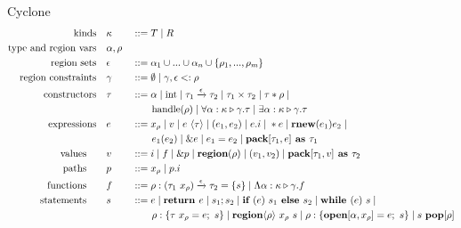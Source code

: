 \documentclass[aspectratio=169]{beamer}
\begin{document}
\begin{frame}{Cyclone}
\scriptsize{
\begin{alignat*}{2}
\text{kinds}\quad &\kappa &&::= T \altm R
\\
\text{type and region vars}\quad &\alpha,\rho &&
\\
\text{region sets}\quad &\epsilon &&::= \alpha_1 \cup ... \cup \alpha_n \cup \{\rho_1,...,\rho_m\}
\\
\text{region constraints} \quad &\gamma &&::= \emptyset \altm \gamma, \epsilon <: \rho
\\
\text{constructors} \quad &\tau &&::= \alpha \altm \text{int} \altm \tau_1 \xrightarrow[]{\epsilon} \tau_2 \altm \tau_1 \times \tau_2 \altm \tau \ast \rho \altm
\\
~ & ~ && \qquad \text{handle}(\rho) \altm \forall\alpha:\kappa \triangleright \gamma.\tau \altm \exists \alpha:\kappa \triangleright \gamma.\tau
\\
\text{expressions} \quad &e &&::= x_\rho \altm v \altm e\ \langle\tau\rangle \altm (e_1,e_2) \altm e.i \altm \ast e \altm \textbf{rnew}(e_1)e_2 \altm
\\
~ & ~ && \qquad e_1(e_2) \altm \&e \altm e_1 = e_2 \altm \textbf{pack} [\tau_1, e]\textbf{ as } \tau_1
\\
\text{values} \qquad &v &&::= i \altm f \altm \&p \altm \textbf{region}(\rho) \altm (v_1, v_2) \altm \textbf{pack}[\tau_1,v]\textbf{ as } \tau_2
\\
\text{paths} \qquad &p &&::= x_\rho \altm p.i
\\
\text{functions} \qquad &f &&::= \rho:(\tau_1\ x_{\rho}) \xrightarrow[]{\epsilon} \tau_2 = \{s\} \altm \Lambda\alpha:\kappa \triangleright \gamma.f
\\
\text{statements} \qquad &s &&::= e \altm \textbf{return } e \altm s_1;s_2 \altm \textbf{if } (e)\ s_1 \textbf{ else } s_2 \altm \textbf{while } (e)\ s \altm
\\
~ & ~ && \qquad \rho:\{\tau\ x_\rho = e;\ s\} \altm \textbf{region}\langle\rho\rangle\ x_{\rho}\ s \altm \rho:\{\textbf{open}[\alpha,x_{\rho}] = e;\ s\} \altm s\ \textbf{pop}[\rho]
\end{alignat*}
    }
\end{frame}
\end{document}

